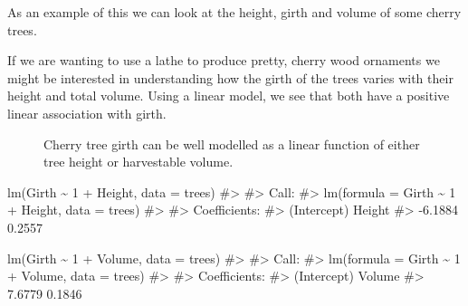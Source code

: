 \documentclass[
  letterpaper,
  DIV=11,
  numbers=noendperiod]{scrreprt}
\newenvironment{Shaded}{\begin{snugshade}}{\end{snugshade}}
\newcommand{\AttributeTok}[1]{\textcolor[rgb]{0.40,0.45,0.13}{#1}}
\newcommand{\CommentTok}[1]{\textcolor[rgb]{0.37,0.37,0.37}{#1}}
\newcommand{\DecValTok}[1]{\textcolor[rgb]{0.68,0.00,0.00}{#1}}
\newcommand{\FunctionTok}[1]{\textcolor[rgb]{0.28,0.35,0.67}{#1}}
\newcommand{\NormalTok}[1]{\textcolor[rgb]{0.00,0.23,0.31}{#1}}
\newcommand{\SpecialCharTok}[1]{\textcolor[rgb]{0.37,0.37,0.37}{#1}}
\begin{document}
As an example of this we can look at the height, girth and volume of
some cherry trees.

If we are wanting to use a lathe to produce pretty, cherry wood
ornaments we might be interested in understanding how the girth of the
trees varies with their height and total volume. Using a linear model,
we see that both have a positive linear association with girth.

\begin{figure}


\caption{\label{fig-cherry-tree-lm}Cherry tree girth can be well
modelled as a linear function of either tree height or harvestable
volume.}

\end{figure}%

\begin{Shaded}
\begin{Highlighting}[]
\FunctionTok{lm}\NormalTok{(Girth }\SpecialCharTok{\textasciitilde{}} \DecValTok{1} \SpecialCharTok{+}\NormalTok{ Height, }\AttributeTok{data =}\NormalTok{ trees)}
\CommentTok{\#\textgreater{} }
\CommentTok{\#\textgreater{} Call:}
\CommentTok{\#\textgreater{} lm(formula = Girth \textasciitilde{} 1 + Height, data = trees)}
\CommentTok{\#\textgreater{} }
\CommentTok{\#\textgreater{} Coefficients:}
\CommentTok{\#\textgreater{} (Intercept)       Height  }
\CommentTok{\#\textgreater{}     {-}6.1884       0.2557}
\end{Highlighting}
\end{Shaded}

\begin{Shaded}
\begin{Highlighting}[]
\FunctionTok{lm}\NormalTok{(Girth }\SpecialCharTok{\textasciitilde{}} \DecValTok{1} \SpecialCharTok{+}\NormalTok{ Volume, }\AttributeTok{data =}\NormalTok{ trees)}
\CommentTok{\#\textgreater{} }
\CommentTok{\#\textgreater{} Call:}
\CommentTok{\#\textgreater{} lm(formula = Girth \textasciitilde{} 1 + Volume, data = trees)}
\CommentTok{\#\textgreater{} }
\CommentTok{\#\textgreater{} Coefficients:}
\CommentTok{\#\textgreater{} (Intercept)       Volume  }
\CommentTok{\#\textgreater{}      7.6779       0.1846}
\end{Highlighting}
\end{Shaded}
\end{document}
